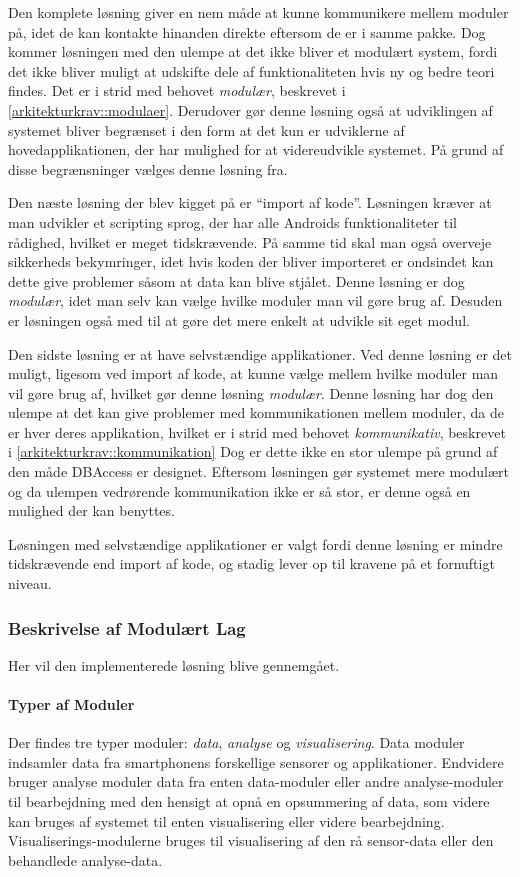 Den komplete løsning giver en nem måde at kunne kommunikere mellem moduler på, idet de kan kontakte hinanden direkte eftersom de er i samme pakke.
Dog kommer løsningen med den ulempe at det ikke bliver et modulært system, fordi det ikke bliver muligt at udskifte dele af funktionaliteten hvis ny og bedre teori findes.
Det er i strid med behovet \textit{modulær}, beskrevet i \cref{arkitekturkrav::modulaer}.
Derudover gør denne løsning også at udviklingen af systemet bliver begrænset i den form at det kun er udviklerne af hovedapplikationen, der har mulighed for at videreudvikle systemet.
På grund af disse begrænsninger vælges denne løsning fra. 

Den næste løsning der blev kigget på er ``import af kode''.
Løsningen kræver at man udvikler et scripting sprog, der har alle Androids funktionaliteter til rådighed, hvilket er meget tidskrævende.
På samme tid skal man også overveje sikkerheds bekymringer, idet hvis koden der bliver importeret er ondsindet kan dette give problemer såsom at data kan blive stjålet. 
Denne løsning er dog \textit{modulær}, idet man selv kan vælge hvilke moduler man vil gøre brug af.
Desuden er løsningen også med til at gøre det mere enkelt at udvikle sit eget modul.

Den sidste løsning er at have selvstændige applikationer.
Ved denne løsning er det muligt, ligesom ved import af kode, at kunne vælge mellem hvilke moduler man vil gøre brug af, hvilket gør denne løsning \textit{modulær}.
Denne løsning har dog den ulempe at det kan give problemer med kommunikationen mellem moduler, da de er hver deres applikation, hvilket er i strid med behovet \textit{kommunikativ}, beskrevet i \cref{arkitekturkrav::kommunikation}
Dog er dette ikke en stor ulempe på grund af den måde DBAccess er designet.
Eftersom løsningen gør systemet mere modulært og da ulempen vedrørende kommunikation ikke er så stor, er denne også en mulighed der kan benyttes.

Løsningen med selvstændige applikationer er valgt fordi denne løsning er mindre tidskrævende end import af kode, og stadig lever op til kravene på et fornuftigt niveau.



\subsubsection{Beskrivelse af Modulært Lag}\label{modul_definition}
Her vil den implementerede løsning blive gennemgået.

\paragraph{Typer af Moduler}
Der findes tre typer moduler: \textit{data}, \textit{analyse} og \textit{visualisering}.
Data moduler indsamler data fra smartphonens forskellige sensorer og applikationer.
Endvidere bruger analyse moduler data fra enten data-moduler eller andre analyse-moduler til bearbejdning med den hensigt at opnå en opsummering af data, som videre kan bruges af systemet til enten visualisering eller videre bearbejdning.
Visualiserings-modulerne bruges til visualisering af den rå sensor-data eller den behandlede analyse-data.


